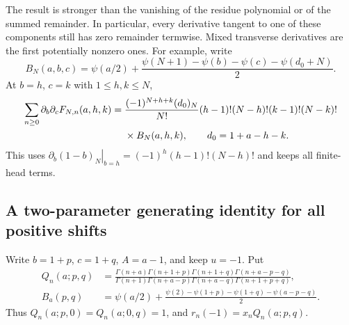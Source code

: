 \documentclass[11pt,a4paper]{article}
\numberwithin{equation}{section}
\theoremstyle{definition}
\theoremstyle{remark}
\begin{document}
The result is stronger than the vanishing of the residue polynomial
or of the summed remainder. In particular, every derivative tangent
to one of these components still has zero remainder termwise.
Mixed transverse derivatives are the first potentially nonzero ones.
For example, write
\[
 B_N(a,b,c)=\psi(a/2)+
 \frac{\psi(N+1)-\psi(b)-\psi(c)-\psi(d_0+N)}2.
\]
At $b=h$, $c=k$ with $1\leq h,k\leq N$,
\begin{align}
 \sum_{n\geq0}\partial_b\partial_cF_{N,n}(a,h,k)
 ={}&\frac{(-1)^{N+h+k}(d_0)_N}{N!}
 (h-1)!(N-h)!(k-1)!(N-k)!\notag\\
 &\times B_N(a,h,k),\qquad d_0=1+a-h-k.
 \label{dg:grid-first-mixed}
\end{align}
This uses $\left.\partial_b(1-b)_N\right|_{b=h}
=(-1)^h(h-1)!(N-h)!$ and keeps all finite-head terms.

\subsection{A two-parameter generating identity for all positive shifts}

Write $b=1+p$, $c=1+q$, $A=a-1$, and keep $u=-1$. Put
\begin{align}
 Q_n(a;p,q)
 &=\frac{\Gamma(n+a)\Gamma(n+1+p)\Gamma(n+1+q)
                         \Gamma(n+a-p-q)}
 {\Gamma(n+1)\Gamma(n+a-p)\Gamma(n+a-q)
                         \Gamma(n+1+p+q)},\label{dg:Q}\\
 B_a(p,q)&=\psi(a/2)+\frac{\psi(2)-\psi(1+p)-\psi(1+q)
                                      -\psi(a-p-q)}2.
 \label{dg:B}
\end{align}
Thus $Q_n(a;p,0)=Q_n(a;0,q)=1$, and $r_n(-1)=x_nQ_n(a;p,q)$.
\end{document}

